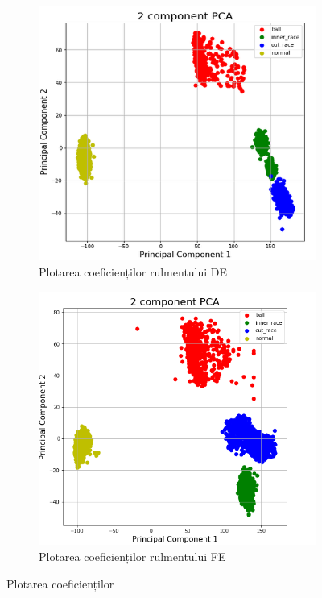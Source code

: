 \documentclass[a4paper,12pt]{report}
\begin{document}
    	\begin{figure}[H]
    		\begin{subfigure}[b]{0.45\textwidth}
    			\includegraphics[width=\textwidth]{images/PCA_DE_12k_MFCC.PNG}
    			\caption{Plotarea coeficienților rulmentului DE}
    			\label{fig:DE_MFCC}
    		\end{subfigure}
    		\hfill
    		\begin{subfigure}[b]{0.45\textwidth}
    			\includegraphics[width=\textwidth]{images/PCA_FE_12k_MFCC.PNG}
    			\caption{Plotarea coeficienților rulmentului FE}
    				\label{fig:FE_MFCC}
    		\end{subfigure}
    		\caption{Plotarea coeficienților}
    		\label{fig:DE_FE_MFC}
    	\end{figure}
    
\end{document}

